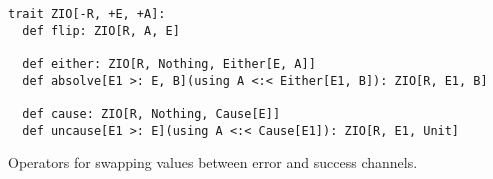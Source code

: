 \begin{algorithm}

\begin{verbatim}
trait ZIO[-R, +E, +A]:
  def flip: ZIO[R, A, E]

  def either: ZIO[R, Nothing, Either[E, A]]
  def absolve[E1 >: E, B](using A <:< Either[E1, B]): ZIO[R, E1, B]

  def cause: ZIO[R, Nothing, Cause[E]]
  def uncause[E1 >: E](using A <:< Cause[E1]): ZIO[R, E1, Unit]
\end{verbatim}

\caption{Operators for swapping values between error and success channels. \label{zio:error-tricks}}
\end{algorithm}